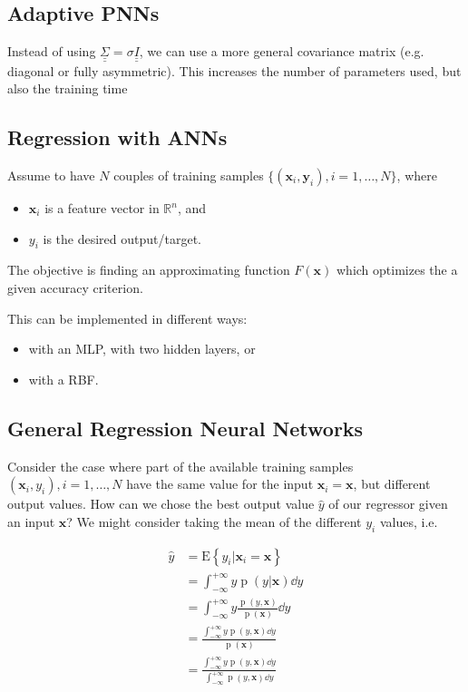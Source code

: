 \documentclass[oneside,onecolumn]{report}
\newcommand{\E}[1]{\text{E} \left\{ #1 \right\}}
\DeclareMathOperator*{\pdf}{p}
\begin{document}
\subsection{Adaptive PNNs}
Instead of using $\underline{\underline{\Sigma}} = \sigma \underline{\underline{I}}$, we can use a more general covariance matrix (e.g. diagonal or fully asymmetric).
This increases the number of parameters used, but also the training time



\subsection{Regression with ANNs}
Assume to have $N$ couples of training samples $\{ (\bm x_i, \bm y_i), i = 1, \dots, N\}$, where
\begin{itemize}
    \item $\bm x_i$ is a feature vector in $\mathbb R^n$, and
    \item $y_i$ is the desired output/target.
\end{itemize}

The objective is finding an approximating function $F(\bm x)$ which optimizes the a given accuracy criterion.

This can be implemented in different ways:
\begin{itemize}
    \item with an MLP, with two hidden layers, or
    \item with a RBF.
\end{itemize}


\subsection{General Regression Neural Networks}
Consider the case where part of the available training samples $(\bm x_i, y_i), i = 1, \dots, N$ have the same value for the input $\bm x_i = \bm x$, but different output values.
How can we chose the best output value $\widehat y$ of our regressor given an input $\bm x$?
We might consider taking the mean of the different $y_i$ values, i.e.

\begin{align*}
    \widehat y
    &= \E{y_i | \bm x_i = \bm x} \\
    &= \int_{-\infty}^{+\infty} y \pdf(y | \bm x) \dd y \\
    &= \int_{-\infty}^{+\infty} y \frac{\pdf(y, \bm x)}{\pdf(\bm x)} \dd y \\
    &= \frac{\int_{-\infty}^{+\infty} y \pdf(y, \bm x) \dd y}{\pdf(\bm x)} \\
    &= \frac{\displaystyle \int_{-\infty}^{+\infty} y \pdf(y, \bm x) \dd y}{\displaystyle \int_{-\infty}^{+\infty} \pdf(y, \bm x) \dd y}
\end{align*}
\end{document}
